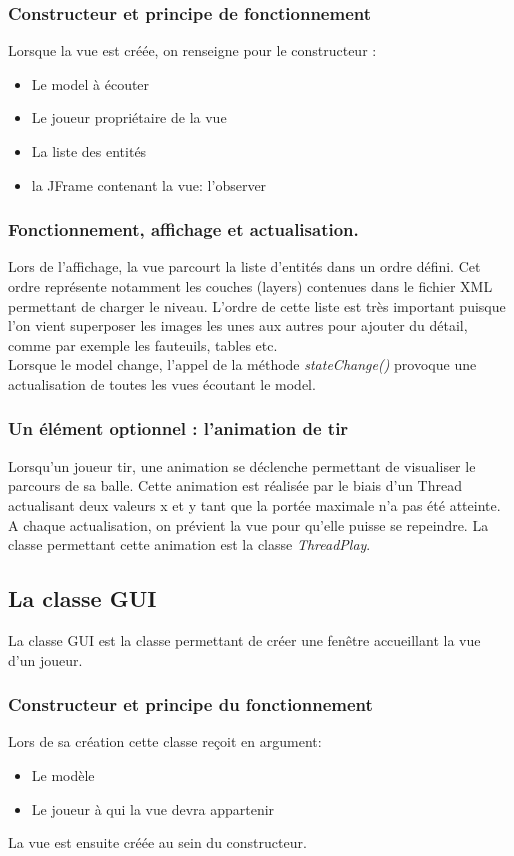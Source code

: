 \documentclass[a4paper,12pt]{article} %
\begin{document}
\subsubsection{Constructeur et principe de fonctionnement}
Lorsque la vue est créée, on renseigne pour le constructeur :
\begin{itemize}
\item Le model à écouter
\item Le joueur propriétaire de la vue
\item La liste des entités
\item la JFrame contenant la vue: l'observer
\end{itemize}
\subsubsection{Fonctionnement, affichage et actualisation.}
Lors de l’affichage, la vue parcourt la liste d'entités dans un ordre défini. Cet ordre représente notamment les couches (layers) contenues dans le fichier XML permettant de charger le niveau. L'ordre de cette liste est très important puisque l'on vient superposer les images les unes aux autres pour ajouter du détail, comme par exemple les fauteuils, tables etc.\\
Lorsque le model change, l'appel de la méthode \textit{stateChange()} provoque une actualisation de toutes les vues écoutant le model.
\subsubsection{Un élément optionnel : l’animation de tir}
Lorsqu'un joueur tir, une animation se déclenche permettant de visualiser le parcours de sa balle. Cette animation est réalisée par le biais d'un Thread actualisant deux valeurs x et y tant que la portée maximale n'a pas été atteinte. A chaque actualisation, on prévient la vue pour qu'elle puisse se repeindre. La classe permettant cette animation est la classe \textit{ThreadPlay}. 
\subsection{La classe GUI}
La classe GUI est la classe permettant de créer une fenêtre accueillant la vue d'un joueur.
\subsubsection{Constructeur et principe du fonctionnement}
Lors de sa création cette classe reçoit en argument:
\begin{itemize}
\item Le modèle
\item Le joueur à qui la vue devra appartenir
\end{itemize}
La vue est ensuite créée au sein du constructeur.
\end{document}
